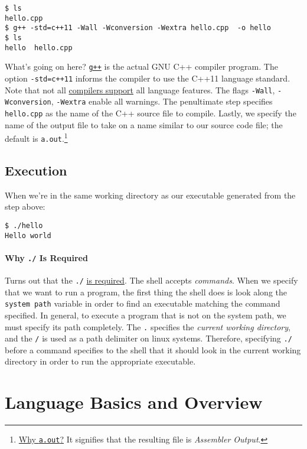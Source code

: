 \documentclass[12pt,letterpaper,twoside]{article}
\begin{document}
\begin{verbatim}
$ ls
hello.cpp
$ g++ -std=c++11 -Wall -Wconversion -Wextra hello.cpp  -o hello
$ ls
hello  hello.cpp
\end{verbatim}

What's going on here?
\href{https://gcc.gnu.org/onlinedocs/gcc/G_002b_002b-and-GCC.html}{\texttt{g++}}
is the actual GNU C++ compiler program. The option
\texttt{-std=c++11} informs the compiler to use the C++11 language
standard. Note that not all
\href{https://en.cppreference.com/w/cpp/compiler_support}{compilers support}
all language features.
The flags \texttt{-Wall}, \texttt{-Wconversion}, \texttt{-Wextra} enable all warnings.
The penultimate step specifies \texttt{hello.cpp} as the name of the
C++ source file to compile.
Lastly, we specify the name of the output file to take on a name
similar to our source code file; the default is
\texttt{a.out}.\footnote{\href{https://en.wikipedia.org/wiki/A.out}{Why
    \texttt{a.out}?} It signifies that the resulting file is
  \emph{Assembler Output}.}

\subsection{Execution}

When we're in the same working directory as our executable generated
from the step above:
{\small
\begin{verbatim}
$ ./hello 
Hello world
\end{verbatim}
}
\vspace{-3ex}
\paragraph{Why \texttt{./} Is Required}
Turns out that the \texttt{./} \href{http://www.linfo.org/dot_slash.html}{is required}.
The shell accepts \emph{commands}. When we specify that we
want to run a program, the first thing the shell does is look along
the \texttt{system path} variable in order to find an executable
matching the command specified. In general, to execute a program that
is not on the system path, we must specify its path completely.
The \texttt{.} specifies the
\emph{current working directory}, and the \texttt{/} is used as a path
delimiter on linux systems. Therefore, specifying \texttt{./} before a
command specifies to the shell that it should look in the current
working directory in order to run the appropriate executable.
\vspace{-3.5ex}
\section{Language Basics and Overview}
\vspace{-2.25ex}
\end{document}
